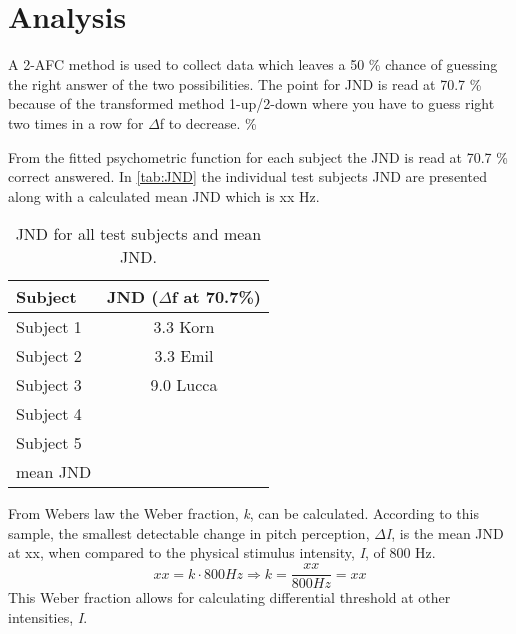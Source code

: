 \section*{Analysis}
A 2-AFC method is used to collect data which leaves a 50 \% chance of guessing the right answer of the two possibilities. The point for JND is read at 70.7 \% because of the transformed method 1-up/2-down where you have to guess right two times in a row for $\Delta$f to decrease.
\%

From the fitted psychometric function for each subject the JND is read at 70.7 \% correct answered. In \autoref{tab:JND} the individual test subjects JND are presented along with a calculated mean JND which is xx Hz. 
%
\begin{table}[H]
	\centering
	\begin{tabular}{l|c}
		Subject     & JND ($\Delta$f at 70.7\%) \\\hline
		Subject 1   & 3.3  Korn            \\\hline
		Subject 2   & 3.3 Emil            \\\hline
		Subject 3   & 9.0 Lucca             \\\hline
		Subject 4   &                  \\\hline
		Subject 5   &                  \\\hline
		mean JND &        
	\end{tabular}
	\caption{JND for all test subjects and mean JND.}
	\label{tab:JND}         
\end{table}
\noindent
%
From Webers law the Weber fraction, \textit{k}, can be calculated. According to this sample, the smallest detectable change in pitch perception, \textit{$\Delta$I}, is the mean JND at xx, when compared to the physical stimulus intensity, \textit{I}, of 800 Hz.
% 
\begin{equation}
xx = k \cdot 800 Hz \Rightarrow k = \frac{xx}{800 Hz} = xx
\end{equation}
%
This Weber fraction allows for calculating differential threshold at other intensities, \textit{I}. 
%
